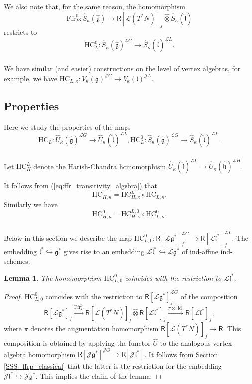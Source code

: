 \documentclass{amsart}
\newtheorem{Lem}[Thm]{Lemma}
\theoremstyle{definition}
\newcommand{\sss}{\subsubsection{}}
\newcommand{\Ring}{\mathsf{R}}
\newcommand{\g}{\mathfrak{g}}
\newcommand{\HC}{\mathrm{HC}} %
\newcommand{\lf}{\mathfrak{l}}
\newcommand{\Jet}{\mathscr{J}}
\newcommand{\Loop}{\mathscr{L}}
\newcommand{\Ffr}{\mathrm{{Ffr}}}
\numberwithin{equation}{section}
\begin{document}
\sss We also note that, for the same reason, the homomorphism 
$$\Ffr_P^0: \widehat{S}_\kappa(\hat{\g})\rightarrow 
\Ring[\Loop(T^*N)]_f\widehat{\otimes}\widehat{S}_\kappa(\hat{\lf})$$ restricts to 
$$\HC^0_L: \widehat{S}_\kappa(\hat{\g})^{\Loop G}\rightarrow \widehat{S}_\kappa(\hat{\lf})^{\Loop L}.$$

\sss\label{SSS_HC_vertex1} 
We have similar (and easier) constructions on the level of vertex algebras, for example, we have $\HC_{L,\kappa}: V_\kappa(\g)^{\Jet G}\rightarrow V_\kappa(\lf)^{\Jet L}$. 

\subsection{Properties}
Here we study the properties of the maps 
$$\HC_L:\widehat{U}_\kappa(\hat{\g})^{\Loop G}\rightarrow 
\widehat{U}_\kappa(\hat{\lf})^{\Loop L}, \HC_L^0: \widehat{S}_\kappa(\hat{\g})^{\Loop G}\rightarrow \widehat{S}_\kappa(\hat{\lf})^{\Loop L}.$$ 

\sss Let $\HC^L_H$ denote the Harish-Chandra homomorphism
$\widehat{U}_\kappa(\hat{\lf})^{\Loop L}\rightarrow 
\widehat{U}_\kappa(\hat{\mathfrak{h}})^{\Loop H}$.

It follows from (\ref{eq:ffr_transitivity_algebra}) that 
\begin{equation}\label{eq:HC_transitivity}
\HC_{H,\kappa}=\HC_{H,\kappa}^L\circ \HC_{L,\kappa}.
\end{equation}
Similarly we have 
\begin{equation}\label{eq:HC_transitivity_cl}
\HC^0_{H,\kappa}=\HC_{H,\kappa}^{L,0}\circ \HC_{L,\kappa}^0.
\end{equation}



\sss

Below in this section we describe the map $\HC^0_{L,0}: \Ring[\Loop \g^*]_f^{\Loop G}\rightarrow \Ring[\Loop \lf^*]^{\Loop L}_f$. The embedding $\lf^*\hookrightarrow \g^*$
gives rise to an embedding $\Loop \lf^*\hookrightarrow \Loop \g^*$ of ind-affine ind-schemes. 

\begin{Lem}\label{Lem:HC0_interpretation}
The homomorphism $\HC^0_{L,0}$ coincides with the restriction to $\Loop \lf^*$.
\end{Lem}



\begin{proof}
$\HC^0_{L,0}$ coincides with the restriction to $\Ring[\Loop \g^*]_f^{\Loop G}$ of the composition  $$ \Ring[\Loop \g^*]_f\xrightarrow{\Ffr_P^0} \Ring[\Loop(T^*N)]_f\widehat{\otimes} \Ring[\Loop \lf^*]_f\xrightarrow{\pi\otimes \operatorname{id}}\Ring[\Loop \lf^*]_f,$$
where $\pi$ denotes the augmentation homomorphism $\Ring[\Loop(T^*N)]_f\rightarrow \Ring$. This composition is obtained by applying the functor $\widehat{U}$ to the analogous vertex algebra homomorphism $\Ring[\Jet \g^*]^{\Jet G}\rightarrow \Ring[\Jet \lf^*]$. It follows from Section \ref{SSS_ffrp_classical}
that the latter is the restriction for the embedding $\Jet \lf^*\hookrightarrow \Jet \g^*$. This implies the claim of the lemma. 
\end{proof}
\end{document}
